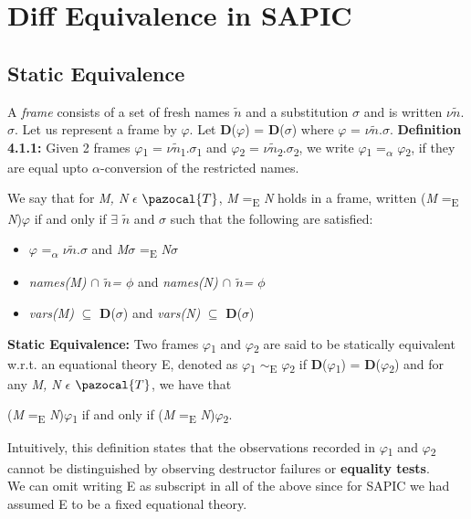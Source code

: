 \documentclass[11pt]{article}
\newcommand{\Ta}{\pazocal{T}}
\begin{document}
\section{Diff Equivalence in SAPIC}
\vspace{0.2cm}

\subsection{Static Equivalence}
A {\it frame} consists of a set of fresh names $\tilde{n}$ and a substitution $\sigma$ and is written $\nu$$\tilde{n}$.$\sigma$. Let us represent a frame by $\varphi$. Let {\bf D}($\varphi$) = {\bf D}($\sigma$) where $\varphi$ = $\nu$$\tilde{n}$.$\sigma$.
\newline\newline
{\bf Definition 4.1.1: }Given 2 frames $\varphi$\textsubscript{1} = $\nu$$\tilde{n}$\textsubscript{1}.$\sigma$\textsubscript{1} and $\varphi$\textsubscript{2} = $\nu$$\tilde{n}$\textsubscript{2}.$\sigma$\textsubscript{2}, we write $\varphi$\textsubscript{1} =\textsubscript{$\alpha$} $\varphi$\textsubscript{2}, if they are equal upto $\alpha$-conversion of the restricted names.
\newline 

We say that for {\it M, N} $\epsilon$ $\Ta$, {\it M} =\textsubscript{E} {\it N} holds in a frame, written ({\it M} =\textsubscript{E} {\it N})$\varphi$ if and only if $\exists$ $\tilde{n}$ and $\sigma$ such that the following are satisfied:
\begin{itemize}
  \item $\varphi$ =\textsubscript{$\alpha$} $\nu$$\tilde{n}$.$\sigma$ and {\it M}$\sigma$ =\textsubscript{E} {\it N}$\sigma$
  \item {\it names(M) $\cap$ $\tilde{n}$= $\phi$} and {\it names(N) $\cap$ $\tilde{n}$= $\phi$} 
  \item {\it vars(M)} $\subseteq$ {\bf D}($\sigma$) and {\it vars(N)} $\subseteq$ {\bf D}($\sigma$)
\end{itemize}


{\bf Static Equivalence: } Two frames $\varphi$\textsubscript{1} and $\varphi$\textsubscript{2} are said to be statically equivalent w.r.t. an equational theory E, denoted as $\varphi$\textsubscript{1} $\sim$\textsubscript{E} $\varphi$\textsubscript{2} if {\bf D}($\varphi$\textsubscript{1}) = {\bf D}($\varphi$\textsubscript{2}) and for any {\it M, N} $\epsilon$ $\Ta$, we have that 
\begin{center}
({\it M} =\textsubscript{E} {\it N})$\varphi$\textsubscript{1} if and only if ({\it M} =\textsubscript{E} {\it N})$\varphi$\textsubscript{2}.
\end{center}
Intuitively,  this  definition  states  that  the  observations recorded in $\varphi$\textsubscript{1} and $\varphi$\textsubscript{2} cannot be distinguished by observing destructor failures or {\bf equality tests}.\\
\hspace*{14pt}{\bf Note 4.1.2:} We can omit writing E as subscript in all of the above since for SAPIC we had assumed E to be a fixed equational theory.
\end{document}
